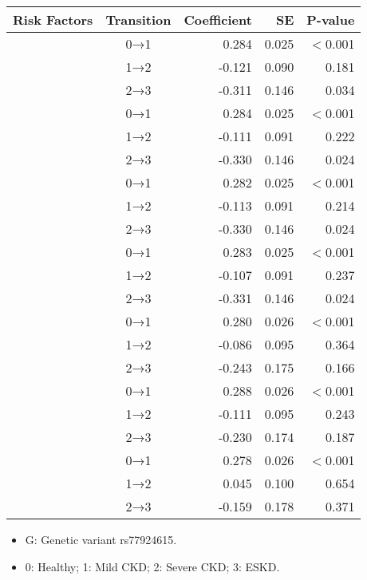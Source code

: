 \begin{table}[!ht]
\caption{\captionukbmodelsriskfactors}
\label{tab:ukb-models-risk-factors}
\centering
\begin{tabular}[t]{lcrrr}
\toprule
Risk Factors & Transition & Coefficient & SE & P-value\\
\midrule
{}  & 0→1 & 0.284 & 0.025 & $<$0.001 \\
  & 1→2 & -0.121 & 0.090 & 0.181 \\
  & 2→3 & -0.311 & 0.146 & 0.034 \\
 & 0→1 & 0.284 & 0.025 & $<$0.001 \\
 & 1→2 & -0.111 & 0.091 & 0.222 \\
 & 2→3 & -0.330 & 0.146 & 0.024 \\
  & 0→1 & 0.282 & 0.025 & $<$0.001 \\
  & 1→2 & -0.113 & 0.091 & 0.214 \\
  & 2→3 & -0.330 & 0.146 & 0.024 \\
 & 0→1 & 0.283 & 0.025 & $<$0.001 \\
 & 1→2 & -0.107 & 0.091 & 0.237 \\
 & 2→3 & -0.331 & 0.146 & 0.024 \\
  & 0→1 & 0.280 & 0.026 & $<$0.001 \\
  & 1→2 & -0.086 & 0.095 & 0.364 \\
  & 2→3 & -0.243 & 0.175 & 0.166 \\
 & 0→1 & 0.288 & 0.026 & $<$0.001 \\
 & 1→2 & -0.111 & 0.095 & 0.243 \\
 & 2→3 & -0.230 & 0.174 & 0.187 \\
  & 0→1 & 0.278 & 0.026 & $<$0.001 \\
  & 1→2 & 0.045 & 0.100 & 0.654 \\
  & 2→3 & -0.159 & 0.178 & 0.371 \\
\bottomrule
\end{tabular}
\parbox{\linewidth}{\footnotesize
\begin{itemize}[leftmargin=*, noitemsep, label=\textcolor{white}{\textbullet}]
 \item G: Genetic variant rs77924615.
 \item 0: Healthy; 1: Mild CKD; 2: Severe CKD; 3: ESKD.
\end{itemize}
}
\end{table}
